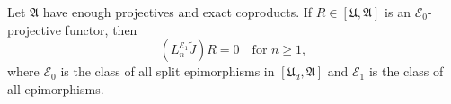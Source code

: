 Let $\mathfrak{A}$ have enough projectives and exact coproducts. If $R \in [\mathfrak{U}, \mathfrak{A}]$ is an $\mathcal{E}_0$-projective functor, then
$$(L_n^{\mathcal{E}_1} \tilde{J}) R = 0 \quad \text{for } n \geq 1,$$
where $\mathcal{E}_0$ is the class of all split epimorphisms in $[\mathfrak{U}_d, \mathfrak{A}]$ and $\mathcal{E}_1$ is the class of all epimorphisms.
